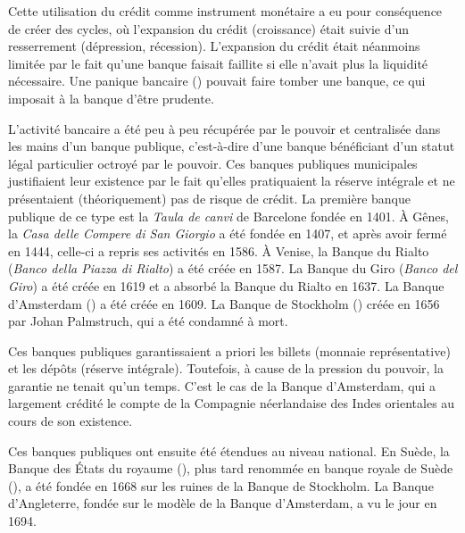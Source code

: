 Cette utilisation du crédit comme instrument monétaire a eu pour conséquence de créer des cycles, où l'expansion du crédit (croissance) était suivie d'un resserrement (dépression, récession). L'expansion du crédit était néanmoins limitée par le fait qu'une banque faisait faillite si elle n'avait plus la liquidité nécessaire. Une panique bancaire () pouvait faire tomber une banque, ce qui imposait à la banque d'être prudente.



L'activité bancaire a été peu à peu récupérée par le pouvoir et centralisée dans les mains d'un banque publique, c'est-à-dire d'une banque bénéficiant d'un statut légal particulier octroyé par le pouvoir. Ces banques publiques municipales justifiaient leur existence par le fait qu'elles pratiquaient la réserve intégrale et ne présentaient (théoriquement) pas de risque de crédit. La première banque publique de ce type est la \emph{Taula de canvi} de Barcelone fondée en 1401. À Gênes, la \emph{Casa delle Compere di San Giorgio} a été fondée en 1407, et après avoir fermé en 1444, celle-ci a repris ses activités en 1586. À Venise, la Banque du Rialto (\emph{Banco della Piazza di Rialto}) a été créée en 1587. La Banque du Giro (\emph{Banco del Giro}) a été créée en 1619 et a absorbé la Banque du Rialto en 1637. La Banque d'Amsterdam () a été créée en 1609. La Banque de Stockholm () créée en 1656 par Johan Palmstruch, qui a été condamné à mort.

Ces banques publiques garantissaient a priori les billets (monnaie représentative) et les dépôts (réserve intégrale). Toutefois, à cause de la pression du pouvoir, la garantie ne tenait qu'un temps. C'est le cas de la Banque d'Amsterdam, qui a largement crédité le compte de la Compagnie néerlandaise des Indes orientales au cours de son existence.

Ces banques publiques ont ensuite été étendues au niveau national. En Suède, la Banque des États du royaume (), plus tard renommée en banque royale de Suède (), a été fondée en 1668 sur les ruines de la Banque de Stockholm. La Banque d'Angleterre, fondée sur le modèle de la Banque d'Amsterdam, a vu le jour en 1694.

